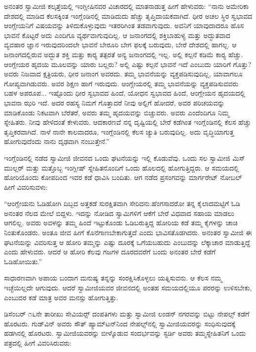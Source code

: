  ಅನಂತರ ಸ್ವಾಮೀಜಿ ಕಲ್ಕತ್ತೆಯಲ್ಲಿ ಇಂಗ್ಲೀಷಿನವರ ವಿಚಾರದಲ್ಲಿ ಮಾತನಾಡುತ್ತ ಹೀಗೆ ಹೇಳುವರು: “ನಾನು ಅಮೇರಿಕಾ ದೇಶದಲ್ಲಿ ಮಾಡಿದ ಕೆಲಸಕ್ಕಿಂತ ಇಂಗ್ಲೆಂಡಿನಲ್ಲಿ ಮಾಡಿದುದು ಹೆಚ್ಚು ತೃಪ್ತಿದಾಯಕವಾಗಿದೆ. ಧೀರ ಅಚಲ ಸ್ಥಿರ ಸ್ವಭಾವದ ಆಂಗ್ಲೇಯನಿಗೆ ವಿಷಯವನ್ನು ತಿಳಿದುಕೊಳ್ಳುವುದು ಇತರರಿಗಿಂತ ತಡವಾಗುವುದು. ಅವನಿಗೆ ಯಾವುದಾದರೂ ಹೊಸ ಭಾವನೆ ಕೊಟ್ಟರೆ ಅದು ಎಂದಿಗೂ ವ್ಯರ್ಥವಾಗುವುದಿಲ್ಲ. ಆ ಜನಾಂಗದಲ್ಲಿ ಶಕ್ತಿಬಾಹುಳ್ಯ ಮತ್ತು ಅದ್ಭುತವಾದ ವ್ಯವಹಾರ ಜ್ಞಾನ ಇರುವುದರಿಂದಲೇ ಭಾವನೆ ಬೇರೂರಿ ಬೇಗ ಫಲಕ್ಕೆ ಬರುವುದು, ಬೇರೆ ದೇಶದಲ್ಲಿ ಹಾಗಲ್ಲ. ಆ ಜನಾಂಗದಲ್ಲಿರುವ ಅದ್ಭುತ ಶಕ್ತಿ ಮತ್ತು ಕಾರ‍್ಯ ತತ್ಪರತೆ ಅನ್ಯ ಜನಾಂಗದಲ್ಲಿ ಇಲ್ಲ. ಅಲ್ಲಿ ಕಲ್ಪನೆ ಕಡಿಮೆ ಕಾರ‍್ಯ ಹೆಚ್ಚು. ಆಂಗ್ಲೇಯರ ಹೃದಯ ಮೂಲವನ್ನು ಯಾರು ಬಲ್ಲರು? ಅಲ್ಲಿ ಎಷ್ಟು ಕಲ್ಪನೆ ಭಾವನೆ ಇದೆ ಎಂಬುದು ಯಾರಿಗೆ ಗೊತ್ತು? ಅವರು ನಿಜವಾದ ಕ್ಷತ್ರಿಯರು, ಧೀರ ಜನಾಂಗ ಅವರದು. ತಮ್ಮ ಭಾವನೆಯನ್ನು ವ್ಯಕ್ತಪಡಿಸುವುದಿಲ್ಲ, ಯಾವಾಗಲೂ ಗೋಪ್ಯವಾಗಿಡುವರು. ಅವರ ಶಿಕ್ಷಣ ಹಾಗೆ ಇರುವುದು. ಆಂಗ್ಲೇಯರಲ್ಲಿ ತಮ್ಮ ಭಾವನೆಯನ್ನು ವ್ಯಕ್ತಪಡಿಸುವವರು ಬಹಳ ಅಪರೂಪ... ಇಷ್ಟೊಂದು ಧೀರ ಸ್ವಭಾವದ ಹಿಂದೆ, ಯೋಧನ ಸ್ವಭಾವದ ಹಿಂದೆ, ಆಂಗ್ಲೇಯನ ಹೃದಯದಲ್ಲಿ ಭಾವನಾ ಝರಿ ಇದೆ. ಅದರ ರಹಸ್ಯ ನಿಮಗೆ ಗೊತ್ತಾದರೆ ನೀವು ಅಲ್ಲಿಗೆ ಹೋದರೆ, ಅವರ ಪರಿಚಯವನ್ನು ಮಾಡಿಕೊಂಡು ನಿಕಟವಾಗಿ ಬೆರೆತರೆ, ಅವರು ತಮ್ಮ ಹೃದಯವನ್ನು ಬಿಚ್ಚುವರು. ಅವರು ಎಂದೆಂದಿಗೂ ನಿಮ್ಮ ಸ್ನೇಹಿತರು. ನೀವು ಹೇಳಿದಂತೆ ಕೇಳುವರು. ಆದಕಾರಣವೆ ನನ್ನ ದೃಷ್ಟಿಯಲ್ಲಿ ಬೇರೆ ಕಡೆಗಿಂತ ಇಂಗ್ಲೆಂಡಿನಲ್ಲಿ ಕೆಲಸ ಹೆಚ್ಚು ತೃಪ್ತಿಕರವಾಗಿದೆ. ನಾಳೆ ನಾನೇ ಕಾಲವಾದರೂ, ಇಂಗ್ಲೆಂಡಿನಲ್ಲಿ ಕೆಲಸ ಚ್ಯುತಿ ಬರುವುದಿಲ್ಲ. ಅದು ವೃದ್ಧಿಯಾಗುತ್ತ ಹೋಗುವುದೆಂದು ನಾನು ದೃಢವಾಗಿ ನಂಬುತ್ತೇನೆ.” 

 ಇಂಗ್ಲೆಂಡಿನಲ್ಲಿ ನಡೆದ ಸ್ವಾಮೀಜಿ ಜೀವನದ ಒಂದು ಘಟನೆಯನ್ನು ಇಲ್ಲಿ ಕೊಡುವೆವು. ಒಂದು ಸಲ ಸ್ವಾಮೀಜಿ ಮಿಸ್ ಮುಲ್ಲರ್ ಮತ್ತು ಮತ್ತೊಬ್ಬ ಇಂಗ್ಲೀಷ್ ಸ್ನೇಹಿತನೊಂದಿಗೆ ಒಂದು ಹೊಲದಲ್ಲಿ ಹೋಗುತ್ತಿದ್ದರು. ಆ ಸಮಯದಲ್ಲಿ ಹೋರಿಯೊಂದು ಕೋಪದಿಂದ ಇವರ ಕಡೆ ಧಾವಿಸಿ ಬಂದಿತು. ಆಗ ನಡೆದ ಪ್ರಸಂಗವನ್ನು ಮಾರ್ಗರೇಟ್ ನೋಬಲ್ ಹೀಗೆ ವಿವರಿಸುವಳು: 

 “ಆಂಗ್ಲೇಯನು ಓಡಿಹೋಗಿ ದಿಬ್ಬದ ಅತ್ತಕಡೆ ಸುರಕ್ಷಿತವಾಗಿ ಸೇರಿದನು.\break ಹೆಂಗಸಾದರೋ ತನ್ನ ಕೈಲಾದಮಟ್ಟಿಗೆ ಓಡಿ ಅನಂತರ ನೆಲದ ಮೇಲೆ ಬಿದ್ದಳು. ಇದನ್ನು ನೋಡಿದ ಸ್ವಾಮಿಗಳಿಗೆ ಆಕೆಗೆ ಬೇರೆ ವಿಧವಾದ ಸಹಾಯ ಮಾಡಲು ಆಗಲಿಲ್ಲ. ಅವರು ಅವಳನ್ನು ತಮ್ಮ ಹಿಂದೆ ಇಟ್ಟುಕೊಂಡು ಓಡಿಬರುತ್ತಿದ್ದ ಹೋರಿಯ ಕಡೆ ತಮ್ಮ ಕೈಗಳನ್ನು ಚಾಚಿ ನಿಂತುಕೊಂಡರು. ಅಂತೂ ಜೀವ ಹೀಗೆ ಕೊನೆಗಾಣಬೇಕಾಗುತ್ತದೆ ಎಂದು ಭಾವಿಸತೊಡಗಿದರು. ಅನಂತರ ಸ್ವಾಮೀಜಿ ಈ ಘಟನೆಯನ್ನು ವಿವರಿಸುತ್ತ ಆ ಹೋರಿ ತಮ್ಮನ್ನು ಎಷ್ಟು ದೂರಕ್ಕೆ ಒಗೆಯಬಹುದು ಎಂಬುದನ್ನು ಲೆಕ್ಕಾಚಾರ ಮಾಡುತ್ತಿದ್ದೆ ಎಂದು ಹೇಳುವರು. ಆದರೆ ಆ ಹೋರಿ ಕೆಲವು ಗಜಗಳ ದೂರದವರೆಗೆ ಬಂದು ಅನಂತರ ಬೇರೆ ಕಡೆಗೆ ಓಡಿಹೋಯಿತು.” 

 ಸಾಧಾರಣವಾಗಿ ಅಪಾಯ ಬಂದಾಗ ಮನುಷ್ಯ ತನ್ನನ್ನು ಸಂರಕ್ಷಿಸಿಕೊಳ್ಳಲು ಯತ್ನಿಸುವನು. ಆ ಕೆಲಸ ನಮ್ಮ ಇಚ್ಛೆಯಿಲ್ಲದೇ ಆಗುವುದು. ಆದರೆ ಸ್ವಾಮೀಜಿಯವರ ಜೀವನದಲ್ಲಿ ಅಂತಹ ಸಮಯದಲ್ಲಿಯೂ ಪರರನ್ನು ಉಳಿಸಬೇಕು, ಎಂಬುದರ ಕಡೆ ಮಾತ್ರ ಅವರ ಮನಸ್ಸು ಹೋಗುತ್ತಿತ್ತು. 

\newpage

 ಡಿಸೆಂಬರ್ ೧೬ನೇ ತಾರೀಖು ಸೇವಿಯರ್ಸ್‍‍ ದಂಪತಿಗಳು ಮತ್ತು ಸ್ವಾಮೀಜಿ ಲಂಡನ್ ನಗರವನ್ನು ಬಿಟ್ಟು ನೇಪಲ್ಸ್ ಕಡೆಗೆ ಹೊರಟರು. ಗುಡ್‌ವಿನ್ ಅವರು ಸೌತ್ ಹ್ಯಾಮ್‌ಟನ್‌ನಿಂದ ನೇಪಲ್ಸ್‌ನಲ್ಲಿ ಸ್ವಾಮೀಜಿಯವರನ್ನು ಸಂಧಿಸುವುದಕ್ಕೆ ಹಡಗಿನಲ್ಲಿ ಹೊರಟರು. ಸ್ವಾಮೀಜಿಯವರನ್ನು ಬೀಳ್ಕೊಡುವ ಸಂದರ್ಭವನ್ನು ಸ್ಟರ್ಡಿ ಅವರು ತಮ್ಮ\break ಸ್ನೇಹಿತನಿಗೆ ಒಂದು ಪತ್ರದಲ್ಲಿ ಹೀಗೆ ವಿವರಿಸಿರುವರು:


